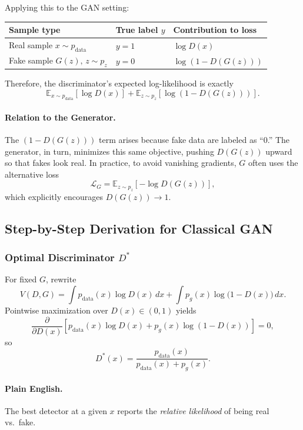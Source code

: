 \documentclass[11pt]{article}
\theoremstyle{remark}
\begin{document}
Applying this to the GAN setting:

\begin{center}
\renewcommand{\arraystretch}{1.3}
\begin{tabular}{@{}lll@{}}
\toprule
\textbf{Sample type} & \textbf{True label $y$} & \textbf{Contribution to loss} \\
\midrule
Real sample $x\sim p_{\text{data}}$ & $y=1$ & $\log D(x)$ \\
Fake sample $G(z),\, z\sim p_z$ & $y=0$ & $\log (1 - D(G(z)))$ \\
\bottomrule
\end{tabular}
\end{center}

Therefore, the discriminator's expected log-likelihood is exactly
\[
\mathbb{E}_{x\sim p_{\text{data}}}[\log D(x)] + \mathbb{E}_{z\sim p_z}[\log(1-D(G(z)))].
\]

\paragraph{Relation to the Generator.}
The $(1-D(G(z)))$ term arises because fake data are labeled as ``0.''
The generator, in turn, minimizes this same objective, pushing $D(G(z))$ upward so that fakes look real. In practice, to avoid vanishing gradients, $G$ often uses the alternative loss
\[
\mathcal{L}_G = \mathbb{E}_{z\sim p_z}[-\log D(G(z))],
\]
which explicitly encourages $D(G(z))\to 1$.

\subsection{Step-by-Step Derivation for Classical GAN}

\subsubsection{Optimal Discriminator $D^*$}
For fixed $G$, rewrite
\begin{equation}
V(D,G)=\int p_{\text{data}}(x)\log D(x)\,dx+\int p_g(x)\log\big(1-D(x)\big)\,dx.
\end{equation}
Pointwise maximization over $D(x)\in(0,1)$ yields
\[
\frac{\partial}{\partial D(x)}\left[p_{\text{data}}(x)\log D(x)+p_g(x)\log(1-D(x))\right]=0,
\]
so
\begin{equation}
\boxed{D^*(x)=\frac{p_{\text{data}}(x)}{p_{\text{data}}(x)+p_g(x)}.}
\end{equation}

\paragraph{Plain English.}
The best detector at a given $x$ reports the \emph{relative likelihood} of being real vs.\ fake.
\end{document}
